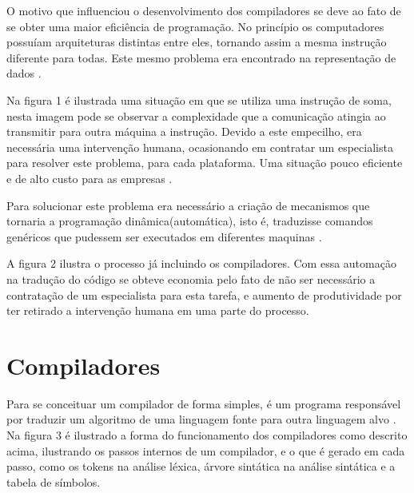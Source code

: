 \documentclass[12pt,oneside,a4paper,chapter=TITLE,section=TITLE,sumario=tradicional]{abntex2}
\begin{document}
O motivo que influenciou o desenvolvimento dos compiladores se deve ao fato de se obter uma maior eficiência de programação. No princípio os computadores possuíam arquiteturas distintas entre eles, tornando assim a mesma instrução diferente para todas. Este mesmo problema era encontrado na representação de dados \cite{ricarte2008}.

Na figura 1 é ilustrada uma situação em que se utiliza uma instrução de soma, nesta imagem pode se observar a complexidade que a comunicação atingia ao transmitir para outra máquina a instrução. Devido a este empecilho, era necessária uma intervenção humana, ocasionando em contratar um especialista para resolver este problema, para cada plataforma. Uma situação pouco eficiente e de alto custo para as empresas  \cite{ricarte2008}.

\begin{figure}[htb]
\end{figure}
Para solucionar este problema era necessário a criação de mecanismos que tornaria a programação dinâmica(automática), isto é, traduzisse comandos genéricos que pudessem ser executados em diferentes maquinas \cite{ricarte2008}.

A figura 2 ilustra o processo já incluindo os compiladores. Com essa automação na tradução do código se obteve economia pelo fato de não ser necessário a contratação de um especialista para esta tarefa, e aumento de produtividade por ter retirado a intervenção humana em uma parte do processo. 

\begin{figure}[htb]
\end{figure}

\section{Compiladores}
\label{sec:compiladores}

Para se conceituar um compilador de forma simples, é um programa responsável por traduzir um algoritmo de uma linguagem fonte para outra linguagem alvo \cite{alfred1995}. Na figura 3 é ilustrado a forma do funcionamento dos compiladores como descrito acima, ilustrando os passos internos de um compilador, e o que é gerado em cada passo, como os tokens na análise léxica, árvore sintática na análise sintática e a tabela de símbolos.
\end{document}
